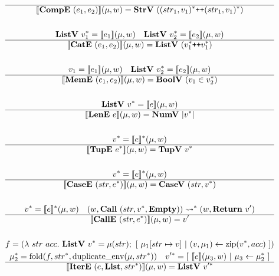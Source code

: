 \begin{gather*}
  \hline
  \sem{\compe ~ (e_1, e_2)}(\mu, w) = \strv ~ (\seq{(str_1, v_1)} \cat \seq{(str_1, v_1)}) \\
%
\newline \\
  \listv ~ \seq{v_1} = \sem{e_1}(\mu, w) \quad
  \listv ~ \seq{v_2} = \sem{e_2}(\mu, w) \\
  \hline
  \sem{\cate ~ (e_1, e_2)}(\mu, w) = \listv ~ (\seq{v_1} \cat \seq{v_1}) \\
%
\newline \\
  v_1 = \sem{e_1}(\mu, w) \quad
  \listv ~ \seq{v_2} = \sem{e_2}(\mu, w) \\
  \hline
  \sem{\meme ~ (e_1, e_2)}(\mu, w) = \boolv ~ (v_1 \in \seq{v_2}) \\
%
\newline \\
  \listv ~ \seq{v} = \sem{e}(\mu, w) \\
  \hline
  \sem{\lene ~ e}(\mu, w) = \numv ~ |\seq v| \\
%
\newline \\
  \seq{v} = \seq{\sem{e}}(\mu, w) \\
  \hline
  \sem{\tupe ~ \seq{e}}(\mu, w) = \tupv ~ \seq{v} \\
%
\newline \\
  \seq{v} = \seq{\sem{e}}(\mu, w) \\
  \hline
  \sem{\casee ~ (str, \seq{e})}(\mu, w) = \casev ~ (str, \seq{v}) \\
%
\newline \\
  \seq{v} = \seq{\sem{e}}(\mu, w) \quad
  (w, \call ~ (str, \seq v, \mt)) \seq{\leadsto} (w, \ret ~ v') \\
  \hline
  \sem{\calle ~ (str, \seq{e})}(\mu, w) = v' \\
%
\newline \\
  f =
    (\lambda ~ str ~ acc. ~
      \listv ~ \seq v = \mu(str); ~
      [ ~ \mu_1[str \mapsto v] ~ | ~ (v, \mu_1) \leftarrow \zip (\seq v, acc) ~ ]
    )
  \\
  \seq{\mu_2} = \fold(f, \seq{str}, \duplicateenv(\mu, \seq{str})) \quad
  \seq{v'} = [ ~ \sem{e}(\mu_3, w) ~ | ~ \mu_3 \leftarrow \seq {\mu_2} ~ ] \\
  \hline
  \sem{\itere ~ (e, \listiter, \seq{str})}(\mu, w) = \listv ~ \seq{v'} \\

\end{gather*}

